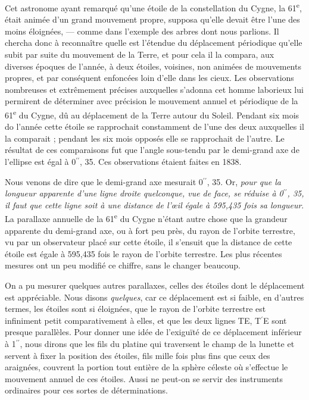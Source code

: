 \documentclass[a4paper, 11pt, oneside]{article}
\begin{document}
Cet astronome ayant remarqué qu'une étoile de la constellation du Cygne, la 61\textsuperscript{e}, était animée d'un grand mouvement propre, supposa qu'elle devait être l'une des moins éloignées, --- comme dans l'exemple des arbres dont nous parlions. Il chercha donc à reconnaître quelle est l'étendue du déplacement périodique qu'elle subit par suite du mouvement de la Terre, et pour cela il la compara, aux diverses époques de l'année, à deux étoiles, voisines, non animées de mouvements propres, et par conséquent enfoncées loin d'elle dans les cieux. Les observations nombreuses et extrêmement précises auxquelles s'adonna cet homme laborieux lui permirent de déterminer avec précision le mouvement annuel et périodique de la 61\textsuperscript{e} du Cygne, dû au déplacement de la Terre autour du Soleil. Pendant six mois do l'année cette étoile se rapprochait constamment de l'une des deux auxquelles il la comparait ; pendant les six mois opposés elle se rapprochait de l'autre. Le résultat de ces comparaisons fut que l'angle sous-tendu par le demi-grand axe de l'ellipse est égal à 0$^{\prime\prime}$, 35. Ces observations étaient faites en 1838.

Nous venons de dire que le demi-grand axe mesurait 0$^{\prime\prime}$, 35. Or, \emph{pour que la longueur apparente d'une ligne droite quelconque, vue de face, se réduise à 0$^{\prime\prime}$, 35, il faut que cette ligne soit à une distance de l'œil égale à 595,435 fois sa longueur}. La parallaxe annuelle de la 61\textsuperscript{e} du Cygne n'étant autre chose que la grandeur apparente du demi-grand axe, ou à fort peu près, du rayon de l'orbite terrestre, vu par un observateur placé sur cette étoile, il s'ensuit que la distance de cette étoile est égale à 595,435 fois le rayon de l'orbite terrestre. Les plus récentes mesures ont un peu modifié ce chiffre, sans le changer beaucoup.

On a pu mesurer quelques autres parallaxes, celles des étoiles dont le déplacement est appréciable. Nous disons \emph{quelques}, car ce déplacement est si faible, en d'autres termes, les étoiles sont si éloignées, que le rayon de l'orbite terrestre est infiniment petit comparativement à elles, et que les deux lignes TE, T$^{\prime}$E sont presque parallèles. Pour donner une idée de l'exiguïté de ce déplacement inférieur à 1$^{\prime\prime}$, nous dirons que les fils du platine qui traversent le champ de la lunette et servent à fixer la position des étoiles, fils mille fois plus fins que ceux des araignées, couvrent la portion tout entière de la sphère céleste où s'effectue le mouvement annuel de ces étoiles. Aussi ne peut-on se servir des instruments ordinaires pour ces sortes de déterminations.
\end{document}
